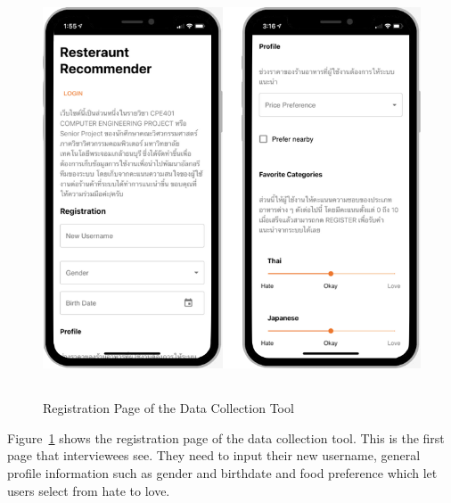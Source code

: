 \documentclass[12pt,oneside,openright,a4paper]{cpe-english-project}
\begin{document}
\begin{figure}[H]\centering
\includegraphics[height=350pt]{./images/4RegistrationPageoftheDataCollectionTool.png}
\caption{Registration Page of the Data Collection Tool}\label{fig:4RegistrationPageoftheDataCollectionTool}
\end{figure}\vspace{-24pt}

Figure~\ref{fig:4RegistrationPageoftheDataCollectionTool} shows the registration page of the data collection tool. This is the first page that interviewees see. They need to input their new username, general profile information such as gender and birthdate and food preference which let users select from hate to love.
\end{document}
